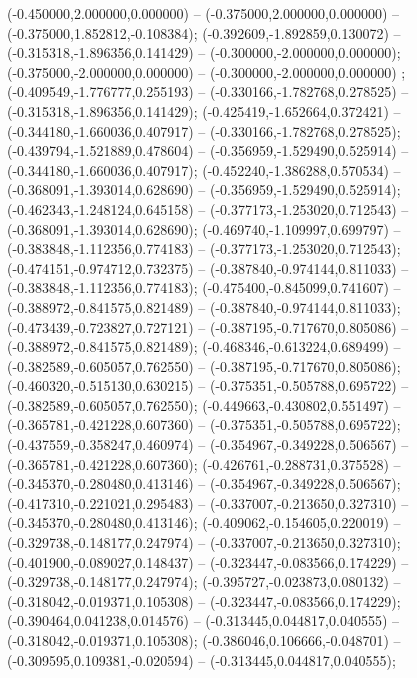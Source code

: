  (-0.450000,2.000000,0.000000) -- (-0.375000,2.000000,0.000000) -- (-0.375000,1.852812,-0.108384);
 (-0.392609,-1.892859,0.130072) -- (-0.315318,-1.896356,0.141429) -- (-0.300000,-2.000000,0.000000);
 (-0.375000,-2.000000,0.000000) -- (-0.300000,-2.000000,0.000000) ;
 (-0.409549,-1.776777,0.255193) -- (-0.330166,-1.782768,0.278525) -- (-0.315318,-1.896356,0.141429);
 (-0.425419,-1.652664,0.372421) -- (-0.344180,-1.660036,0.407917) -- (-0.330166,-1.782768,0.278525);
 (-0.439794,-1.521889,0.478604) -- (-0.356959,-1.529490,0.525914) -- (-0.344180,-1.660036,0.407917);
 (-0.452240,-1.386288,0.570534) -- (-0.368091,-1.393014,0.628690) -- (-0.356959,-1.529490,0.525914);
 (-0.462343,-1.248124,0.645158) -- (-0.377173,-1.253020,0.712543) -- (-0.368091,-1.393014,0.628690);
 (-0.469740,-1.109997,0.699797) -- (-0.383848,-1.112356,0.774183) -- (-0.377173,-1.253020,0.712543);
 (-0.474151,-0.974712,0.732375) -- (-0.387840,-0.974144,0.811033) -- (-0.383848,-1.112356,0.774183);
 (-0.475400,-0.845099,0.741607) -- (-0.388972,-0.841575,0.821489) -- (-0.387840,-0.974144,0.811033);
 (-0.473439,-0.723827,0.727121) -- (-0.387195,-0.717670,0.805086) -- (-0.388972,-0.841575,0.821489);
 (-0.468346,-0.613224,0.689499) -- (-0.382589,-0.605057,0.762550) -- (-0.387195,-0.717670,0.805086);
 (-0.460320,-0.515130,0.630215) -- (-0.375351,-0.505788,0.695722) -- (-0.382589,-0.605057,0.762550);
 (-0.449663,-0.430802,0.551497) -- (-0.365781,-0.421228,0.607360) -- (-0.375351,-0.505788,0.695722);
 (-0.437559,-0.358247,0.460974) -- (-0.354967,-0.349228,0.506567) -- (-0.365781,-0.421228,0.607360);
 (-0.426761,-0.288731,0.375528) -- (-0.345370,-0.280480,0.413146) -- (-0.354967,-0.349228,0.506567);
 (-0.417310,-0.221021,0.295483) -- (-0.337007,-0.213650,0.327310) -- (-0.345370,-0.280480,0.413146);
 (-0.409062,-0.154605,0.220019) -- (-0.329738,-0.148177,0.247974) -- (-0.337007,-0.213650,0.327310);
 (-0.401900,-0.089027,0.148437) -- (-0.323447,-0.083566,0.174229) -- (-0.329738,-0.148177,0.247974);
 (-0.395727,-0.023873,0.080132) -- (-0.318042,-0.019371,0.105308) -- (-0.323447,-0.083566,0.174229);
 (-0.390464,0.041238,0.014576) -- (-0.313445,0.044817,0.040555) -- (-0.318042,-0.019371,0.105308);
 (-0.386046,0.106666,-0.048701) -- (-0.309595,0.109381,-0.020594) -- (-0.313445,0.044817,0.040555);

